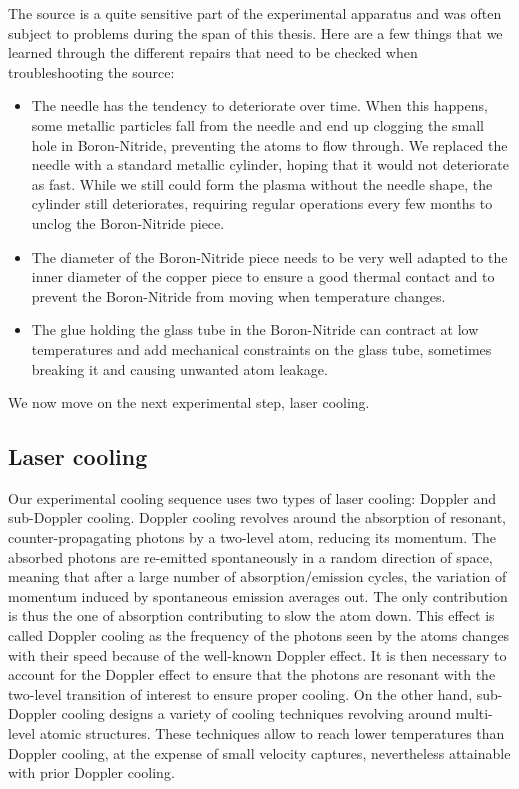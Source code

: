 The source is a quite sensitive part of the experimental apparatus and was often subject to problems during the span of this thesis. Here are a few things that we learned through the different repairs that need to be checked when troubleshooting the source:

\begin{itemize}
    \item The needle has the tendency to deteriorate over time. When this happens, some metallic particles fall from the needle and end up clogging the small hole in Boron-Nitride, preventing the atoms to flow through. We replaced the needle with a standard metallic cylinder, hoping that it would not deteriorate as fast. While we still could form the plasma without the needle shape, the cylinder still deteriorates, requiring regular operations every few months to unclog the Boron-Nitride piece.
    \item The diameter of the Boron-Nitride piece needs to be very well adapted to the inner diameter of the copper piece to ensure a good thermal contact and to prevent the Boron-Nitride from moving when temperature changes.
    \item The glue holding the glass tube in the Boron-Nitride can contract at low temperatures and add mechanical constraints on the glass tube, sometimes breaking it and causing unwanted atom leakage.
\end{itemize}

We now move on the next experimental step, laser cooling.


\subsection{Laser cooling}

Our experimental cooling sequence uses two types of laser cooling: Doppler and sub-Doppler cooling. Doppler cooling revolves around the absorption of resonant, counter-propagating photons by a two-level atom, reducing its momentum. The absorbed photons are re-emitted spontaneously in a random direction of space, meaning that after a large number of absorption/emission cycles, the variation of momentum induced by spontaneous emission averages out. The only contribution is thus the one of absorption contributing to slow the atom down. This effect is called Doppler cooling as the frequency of the photons seen by the atoms changes with their speed because of the well-known Doppler effect. It is then necessary to account for the Doppler effect to ensure that the photons are resonant with the two-level transition of interest to ensure proper cooling. On the other hand, sub-Doppler cooling designs a variety of cooling techniques revolving around multi-level atomic structures. These techniques allow to reach lower temperatures than Doppler cooling, at the expense of small velocity captures, nevertheless attainable with prior Doppler cooling. 


